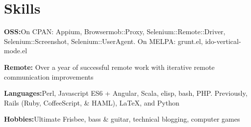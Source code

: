 \section{Skills}
%
\begin{position}
\item[] \textbf{OSS:}\quad On CPAN: Appium, Browsermob::Proxy, Selenium::Remote::Driver, Selenium::Screenshot, Selenium::UserAgent. On MELPA: grunt.el, ido-vertical-mode.el
\item[] \textbf{Remote:} Over a year of successful remote work with iterative remote communication improvements
\item[] \textbf{Languages:}\quad  Perl, Javascript ES6 + Angular, Scala, elisp, bash, PHP. Previously, Rails (Ruby, CoffeeScript, \& HAML), \LaTeX, and Python%
\item[] \textbf{Hobbies:}\quad Ultimate Frisbee, bass \& guitar, technical blogging, computer games
\end{position}

